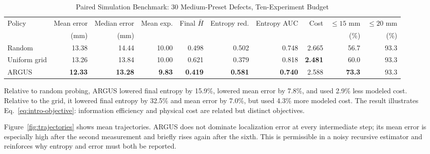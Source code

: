 \documentclass[conference]{IEEEtran}
\newcommand{\Hn}{\bar{H}}
\begin{document}
\begin{table}[t]
\caption{Paired Simulation Benchmark: 30 Medium-Preset Defects, Ten-Experiment Budget}
\label{tab:benchmark}
\centering
\small
\begin{tabular}{lrrrrrrrrr}
\toprule
Policy & Mean error & Median error & Mean exp. & Final $\Hn$ & Entropy red. & Entropy AUC & Cost & $\le15$ mm & $\le20$ mm \\
 & (mm) & (mm) & & & & & & (\%) & (\%) \\
\midrule
Random & 13.38 & 14.44 & 10.00 & 0.498 & 0.502 & 0.748 & 2.665 & 56.7 & 93.3 \\
Uniform grid & 13.26 & 13.84 & 10.00 & 0.621 & 0.379 & 0.818 & \textbf{2.481} & 60.0 & 93.3 \\
ARGUS & \textbf{12.33} & \textbf{13.28} & \textbf{9.83} & \textbf{0.419} & \textbf{0.581} & \textbf{0.740} & 2.588 & \textbf{73.3} & 93.3 \\
\bottomrule
\end{tabular}
\end{table}

Relative to random probing, ARGUS lowered final entropy by 15.9\%, lowered mean error by 7.8\%, and used 2.9\% less modeled cost. Relative to the grid, it lowered final entropy by 32.5\% and mean error by 7.0\%, but used 4.3\% more modeled cost. The result illustrates Eq.~\eqref{eq:intro-objective}: information efficiency and physical cost are related but distinct objectives.

Figure~\ref{fig:trajectories} shows mean trajectories. ARGUS does not dominate localization error at every intermediate step; its mean error is especially high after the second measurement and briefly rises again after the sixth. This is permissible in a noisy recursive estimator and reinforces why entropy and error must both be reported.
\end{document}
